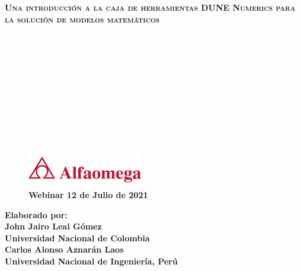 {
\begin{frame}

	\color{c++reviewduneblue}

	\begin{flushleft}\bfseries\scshape\huge
		Una introducción a la caja de herramientas DUNE Numerics
		para la solución de modelos matemáticos
	\end{flushleft}

	\

	\

	\

	\

	\

	\

	\begin{minipage}{0.47\textwidth}
		\begin{figure}[ht!]
			\centering
			\includegraphics[height=1.5cm]{alfaomega}
			\caption*{
				\large
				\bfseries
				\textcolor{c++reviewduneblue}{Webinar 12 de Julio de 2021}
			}
		\end{figure}
	\end{minipage}
	\begin{minipage}{0.5\textwidth}
		\begin{flushright}
			\large
			\bfseries
			Elaborado por:\\
			John Jairo Leal Gómez\\
			Universidad Nacional de Colombia\\
			Carlos Alonso Aznarán Laos\\
			Universidad Nacional de Ingeniería, Perú
		\end{flushright}
	\end{minipage}
\end{frame}
}